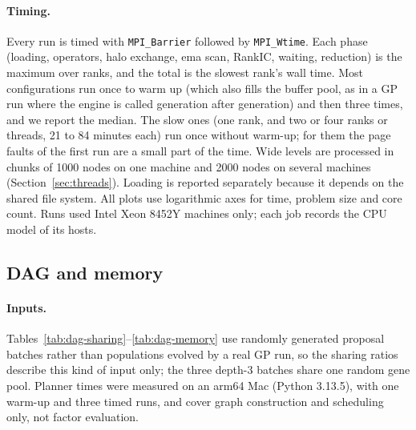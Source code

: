 \documentclass[11pt,a4paper]{article}
\newcommand{\code}[1]{\texttt{#1}}
\begin{document}
\paragraph{Timing.} Every run is timed with \code{MPI\_Barrier} followed by \code{MPI\_Wtime}. Each phase (loading, operators, halo exchange, ema scan, RankIC, waiting, reduction) is the maximum over ranks, and the total is the slowest rank's wall time. Most configurations run once to warm up (which also fills the buffer pool, as in a GP run where the engine is called generation after generation) and then three times, and we report the median. The slow ones (one rank, and two or four ranks or threads, 21 to 84 minutes each) run once without warm-up; for them the page faults of the first run are a small part of the time. Wide levels are processed in chunks of 1000 nodes on one machine and 2000 nodes on several machines (Section~\ref{sec:threads}). Loading is reported separately because it depends on the shared file system. All plots use logarithmic axes for time, problem size and core count. Runs used Intel Xeon 8452Y machines only; each job records the CPU model of its hosts.

\subsection{DAG and memory}
\label{sec:dag-exp}
\paragraph{Inputs.} Tables~\ref{tab:dag-sharing}--\ref{tab:dag-memory} use randomly generated proposal batches rather than populations evolved by a real GP run, so the sharing ratios describe this kind of input only; the three depth-3 batches share one random gene pool. Planner times were measured on an arm64 Mac (Python 3.13.5), with one warm-up and three timed runs, and cover graph construction and scheduling only, not factor evaluation.
\end{document}
